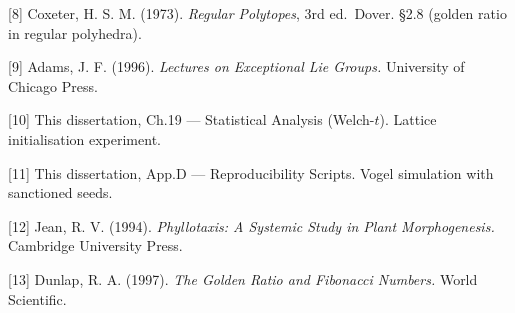 [8] Coxeter, H. S. M. (1973). \emph{Regular
Polytopes}, 3rd ed.~Dover. §2.8 (golden ratio in
regular polyhedra).

[9] Adams, J. F. (1996). \emph{Lectures on
Exceptional Lie Groups.} University of Chicago
Press.

[10] This dissertation, Ch.19 --- Statistical
Analysis (Welch-\(t\)). Lattice initialisation
experiment.

[11] This dissertation, App.D ---
Reproducibility Scripts. Vogel simulation with
sanctioned seeds.

[12] Jean, R. V. (1994). \emph{Phyllotaxis: A
Systemic Study in Plant Morphogenesis.} Cambridge
University Press.

[13] Dunlap, R. A. (1997). \emph{The Golden
Ratio and Fibonacci Numbers.} World Scientific.

